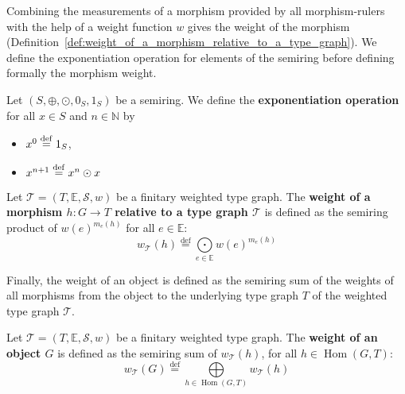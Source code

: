 Combining the measurements of a morphism provided by all morphism-rulers with the help of a weight function $w$ gives the weight of the morphism (Definition~\ref{def:weight_of_a_morphism_relative_to_a_type_graph}).
 We define the exponentiation operation for elements of the semiring before defining formally the morphism weight.
\begin{notation} 
    \label{wfs:def:exponentiation}
Let $(S, \oplus, \odot, 0_S, 1_S)$ be a semiring. We define the \textbf{exponentiation operation} for all $x \in S$ and $n \in \mathbb{N}$ by
   \begin{itemize}
        \item $ x^0 \overset{\operatorname{def}}{=} 1_S$,
        \item $x^{n+1} \overset{\operatorname{def}}{=} x^n \odot x$
   \end{itemize}
\end{notation}
\begin{definition} 
    \label{def:weight_of_a_morphism_relative_to_a_type_graph}
        Let $\mathcal{T}=(T,\mathbb{E},\mathcal{S},w)$ be a finitary weighted type graph.
         The \textbf{weight of a morphism $h: G \rightarrow T$ relative to a type graph $\mathcal{T}$} is defined as the semiring product of $w(e)^{m_e(h)}$ for all $e \in \mathbb{E}$:
        \[  w_{\mathcal{T}}(h) \overset{\operatorname{def}}{=} \underset{e \in \mathbb{E}}{\bigodot} 
                w(e)^{m_e(h)} \]
\end{definition}
Finally, the weight of an object is defined as the semiring sum of the weights of all morphisms from the object to the underlying type graph $T$ of the weighted type graph $\mathcal{T}$.
\begin{definition}
    \label{def:weight_of_an_object_relative_to_a_type_graph}
       Let $\mathcal{T}=(T,\mathbb{E},\mathcal{S},w)$ be a finitary weighted type graph. The \textbf{weight of an object \( G \)} is defined as the semiring sum of $w_\mathcal{T}(h)$, for all \( h \in \operatorname{Hom}(G,T) \):
        \[ w_\mathcal{T}(G) \overset{\operatorname{def}}{=} \underset{h \in \operatorname{Hom}(G,T)}{\bigoplus}  w_\mathcal{T}(h) \]
\end{definition}

